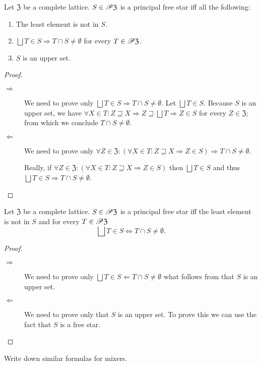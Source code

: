 \begin{prop}
Let $\mathfrak{Z}$ be a complete lattice. $S\in\mathscr{P}\mathfrak{Z}$ is a principal
free star iff all the following:
\begin{enumerate}
\item The least element is not in $S$.
\item $\bigsqcup T\in S\Rightarrow T\cap S\neq\emptyset$ for every $T\in\mathscr{P}\mathfrak{Z}$.
\item $S$ is an upper set.
\end{enumerate}
\end{prop}
\begin{proof}
~
\begin{description}
\item [{$\Rightarrow$}] We need to prove only $\bigsqcup T\in S\Rightarrow T\cap S\neq\emptyset$.
Let $\bigsqcup T\in S$. Because $S$ is an upper set, we have $\forall X\in T:Z\sqsupseteq X\Rightarrow Z\sqsupseteq\bigsqcup T\Rightarrow Z\in S$
for every $Z\in\mathfrak{Z}$;
from which we conclude $T\cap S\neq\emptyset$.
\item [{$\Leftarrow$}] We need to prove only $\forall Z\in\mathfrak{Z}:(\forall X\in T:Z\sqsupseteq X\Rightarrow Z\in S)\Rightarrow T\cap S\neq\emptyset$.


Really, if $\forall Z\in\mathfrak{Z}:(\forall X\in T:Z\sqsupseteq X\Rightarrow Z\in S)$
then $\bigsqcup T\in S$ and thus $\bigsqcup T\in S\Rightarrow T\cap S\neq\emptyset$.

\end{description}
\end{proof}
\begin{prop}
Let $\mathfrak{Z}$ be a complete lattice. $S\in\mathscr{P}\mathfrak{Z}$
is a principal free star iff the least element is not
in $S$ and for every $T\in\mathscr{P}\mathfrak{Z}$
\[
\bigsqcup T\in S\Leftrightarrow T\cap S\neq\emptyset.
\]
\end{prop}
\begin{proof}
~
\begin{description}
\item [{$\Rightarrow$}] We need to prove only $\bigsqcup T\in S\Leftarrow T\cap S\neq\emptyset$
what follows from that $S$ is an upper set.
\item [{$\Leftarrow$}] We need to prove only that $S$ is an upper set.
To prove this we can use the fact that $S$ is a free star.
\end{description}
\end{proof}
\begin{xca}
Write down similar formulas for mixers.
\end{xca}

